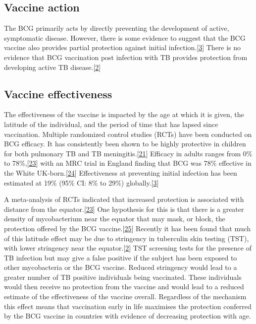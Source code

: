 \documentclass[11pt,twoside]{bristolthesis}
\begin{document}
  \hypertarget{vaccine-action}{%
  \subsection{Vaccine action}\label{vaccine-action}}
  
  The BCG primarily acts by directly preventing the development of active, symptomatic disease. However, there is some evidence to suggest that the BCG vaccine also provides partial protection against initial infection.{[}\protect\hyperlink{ref-Roy2014}{3}{]} There is no evidence that BCG vaccination post infection with TB provides protection from developing active TB disease.{[}\protect\hyperlink{ref-TheWorldHealthOrganization:2018va}{2}{]}
  
  \hypertarget{vaccine-effectiveness}{%
  \subsection{Vaccine effectiveness}\label{vaccine-effectiveness}}
  
  The effectiveness of the vaccine is impacted by the age at which it is given, the latitude of the individual, and the period of time that has lapsed since vaccination. Multiple randomized control studies (RCTs) have been conducted on BCG efficacy. It has consistently been shown to be highly protective in children for both pulmonary TB and TB meningitis.{[}\protect\hyperlink{ref-Rodrigues1993}{21}{]} Efficacy in adults ranges from 0\% to 78\%,{[}\protect\hyperlink{ref-Mangtani2014a}{23}{]} with an MRC trial in England finding that BCG was 78\% effective in the White UK-born.{[}\protect\hyperlink{ref-Hart1972}{24}{]} Effectiveness at preventing initial infection has been estimated at 19\% (95\% CI: 8\% to 29\%) globally.{[}\protect\hyperlink{ref-Roy2014}{3}{]}
  
  A meta-analysis of RCTs indicated that increased protection is associated with distance from the equator.{[}\protect\hyperlink{ref-Mangtani2014a}{23}{]} One hypothesis for this is that there is a greater density of mycobacterium near the equator that may mask, or block, the protection offered by the BCG vaccine.{[}\protect\hyperlink{ref-Zwerling2011}{25}{]} Recently it has been found that much of this latitude effect may be due to stringency in tuberculin skin testing (TST), with lower stringency near the equator.{[}\protect\hyperlink{ref-TheWorldHealthOrganization:2018va}{2}{]} TST screening tests for the presence of TB infection but may give a false positive if the subject has been exposed to other mycobacteria or the BCG vaccine. Reduced stringency would lead to a greater number of TB positive individuals being vaccinated. These individuals would then receive no protection from the vaccine and would lead to a reduced estimate of the effectiveness of the vaccine overall. Regardless of the mechanism this effect means that vaccination early in life maximises the protection conferred by the BCG vaccine in countries with evidence of decreasing protection with age.
  
\end{document}
